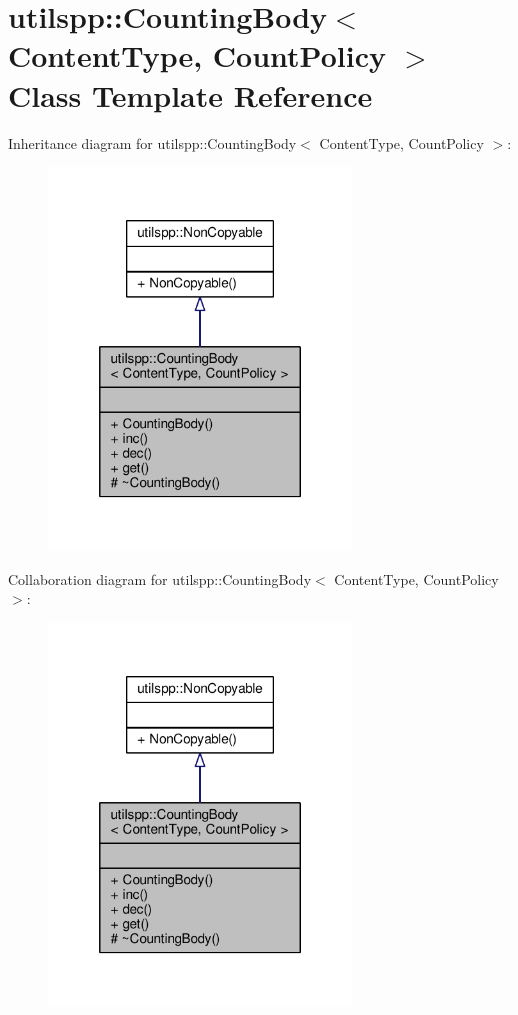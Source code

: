 \hypertarget{classutilspp_1_1CountingBody}{\section{utilspp\-:\-:Counting\-Body$<$ Content\-Type, Count\-Policy $>$ Class Template Reference}
\label{classutilspp_1_1CountingBody}
}


Inheritance diagram for utilspp\-:\-:Counting\-Body$<$ Content\-Type, Count\-Policy $>$\-:
\nopagebreak
\begin{figure}[H]
\begin{center}
\leavevmode
\includegraphics[width=228pt]{classutilspp_1_1CountingBody__inherit__graph}
\end{center}
\end{figure}


Collaboration diagram for utilspp\-:\-:Counting\-Body$<$ Content\-Type, Count\-Policy $>$\-:
\nopagebreak
\begin{figure}[H]
\begin{center}
\leavevmode
\includegraphics[width=228pt]{classutilspp_1_1CountingBody__coll__graph}
\end{center}
\end{figure}
